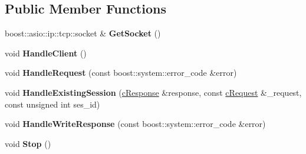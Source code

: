 \subsection*{\-Public \-Member \-Functions}
\begin{DoxyCompactItemize}
\item 
\hypertarget{classhttp__server_1_1cHttpConnection_ad9175494a963a2e2f7fafb31c24c4783}{
boost\-::asio\-::ip\-::tcp\-::socket \& {\bfseries \-Get\-Socket} ()}
\label{classhttp__server_1_1cHttpConnection_ad9175494a963a2e2f7fafb31c24c4783}

\item 
\hypertarget{classhttp__server_1_1cHttpConnection_a0559eb591a884a16d90f2e061a5530f6}{
void {\bfseries \-Handle\-Client} ()}
\label{classhttp__server_1_1cHttpConnection_a0559eb591a884a16d90f2e061a5530f6}

\item 
\hypertarget{classhttp__server_1_1cHttpConnection_aad4d12163015ab391b40bb15b9a5ecb0}{
void {\bfseries \-Handle\-Request} (const boost\-::system\-::error\-\_\-code \&error)}
\label{classhttp__server_1_1cHttpConnection_aad4d12163015ab391b40bb15b9a5ecb0}

\item 
\hypertarget{classhttp__server_1_1cHttpConnection_aa9343fd8557891c23c8fd73b5641fedd}{
void {\bfseries \-Handle\-Existing\-Session} (\hyperlink{classhttp__server_1_1cResponse}{c\-Response} \&response, const \hyperlink{classhttp__server_1_1cRequest}{c\-Request} \&\-\_\-request, const unsigned int ses\-\_\-id)}
\label{classhttp__server_1_1cHttpConnection_aa9343fd8557891c23c8fd73b5641fedd}

\item 
\hypertarget{classhttp__server_1_1cHttpConnection_a128cc40027898c87335516147b767b87}{
void {\bfseries \-Handle\-Write\-Response} (const boost\-::system\-::error\-\_\-code \&error)}
\label{classhttp__server_1_1cHttpConnection_a128cc40027898c87335516147b767b87}

\item 
\hypertarget{classhttp__server_1_1cHttpConnection_aac06a1408cb3b2e20e08817858e45443}{
void {\bfseries \-Stop} ()}
\label{classhttp__server_1_1cHttpConnection_aac06a1408cb3b2e20e08817858e45443}

\end{DoxyCompactItemize}
